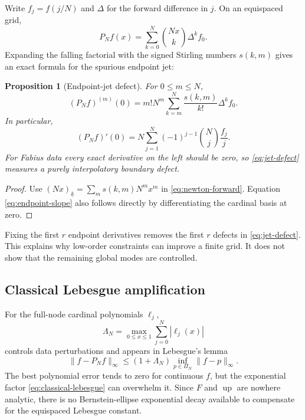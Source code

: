 \documentclass[11pt,oneside]{article}
\newtheorem{proposition}[theorem]{Proposition}
\theoremstyle{definition}
\theoremstyle{remark}
\newcommand{\Up}{\operatorname{up}}
\begin{document}
Write $f_j=f(j/N)$ and $\Delta$ for the forward difference in $j$.  On an equispaced grid,
\begin{equation}
 P_Nf(x)=\sum_{k=0}^{N}\binom{Nx}{k}\Delta^kf_0.
 \label{eq:newton-forward}
\end{equation}
Expanding the falling factorial with the signed Stirling numbers $s(k,m)$ gives an exact
formula for the spurious endpoint jet:
\begin{proposition}[Endpoint-jet defect]
\label{prop:jet-defect}
For $0\le m\le N$,
\begin{equation}
 (P_Nf)^{(m)}(0)
 =m!N^m\sum_{k=m}^{N}\frac{s(k,m)}{k!}\Delta^kf_0.
 \label{eq:jet-defect}
\end{equation}
In particular,
\begin{equation}
 (P_Nf)'(0)
 =N\sum_{j=1}^{N}(-1)^{j-1}\binom Nj\frac{f_j}{j}.
 \label{eq:endpoint-slope}
\end{equation}
For Fabius data every exact derivative on the left should be zero, so
\eqref{eq:jet-defect} measures a purely interpolatory boundary defect.
\end{proposition}

\begin{proof}
Use $(Nx)_{\underline{k}}=\sum_m s(k,m)N^mx^m$ in
\eqref{eq:newton-forward}.  Equation \eqref{eq:endpoint-slope} also follows directly by
differentiating the cardinal basis at zero.
\end{proof}

Fixing the first $r$ endpoint derivatives removes the first $r$ defects in
\eqref{eq:jet-defect}.  This explains why low-order constraints can improve a finite grid.
It does not show that the remaining global modes are controlled.

\subsection{Classical Lebesgue amplification}

For the full-node cardinal polynomials $\ell_j$,
\begin{equation}
 \Lambda_N=\max_{0\le x\le1}\sum_{j=0}^{N}|\ell_j(x)|
 \label{eq:Lebesgue-ordinary}
\end{equation}
controls data perturbations and appears in Lebesgue's lemma
\begin{equation}
 \|f-P_Nf\|_\infty\le(1+\Lambda_N)\inf_{p\in\Pi_N}\|f-p\|_\infty.
 \label{eq:lebesgue-lemma}
\end{equation}
The best polynomial error tends to zero for continuous $f$, but the exponential factor
\eqref{eq:classical-lebesgue} can overwhelm it.  Since $F$ and $\Up$ are nowhere analytic,
there is no Bernstein-ellipse exponential decay available to compensate for the equispaced
Lebesgue constant.
\end{document}
